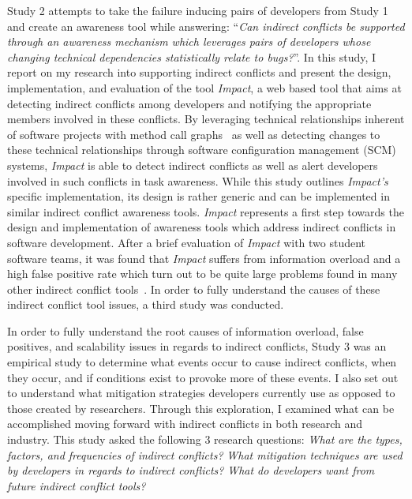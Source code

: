 Study 2 attempts to take the failure inducing pairs of developers from Study 1 and create an awareness tool while
answering: ``\textit{Can indirect conflicts be supported through an awareness mechanism which leverages pairs of
developers whose changing technical dependencies statistically relate to bugs?}''.
In this study, I report on my research into supporting indirect conflicts and present the design, implementation, and 
evaluation of the tool \textit{Impact}, a web based tool that aims at detecting indirect conflicts among developers and 
notifying the appropriate members involved in these conflicts. By leveraging technical relationships inherent of software 
projects with method call graphs~\cite{Lakhotia:1993:CCM} as well as detecting changes to these technical relationships 
through software configuration management (SCM) systems, \textit{Impact} is able to detect indirect conflicts as well as 
alert developers involved in such conflicts in task awareness. While this study outlines \textit{Impact's} specific 
implementation, its design is rather generic and can be implemented in similar indirect conflict awareness tools. 
\textit{Impact} represents a first step towards the design and implementation of awareness tools which address indirect 
conflicts in software development. After a brief evaluation of \textit{Impact} with two student software teams, it was
found that \textit{Impact} suffers from information overload and a high false positive rate which turn out to be quite
large problems found in many other indirect conflict
tools~\cite{Sarma:2007:TSA, Holmes:2010:CAR, Trainer:2005:BGT, Servant:2010:CPI, Borici:2012:CHA}. In order to fully understand 
the causes of these indirect conflict tool issues, a third study was conducted.


In order to fully understand the root causes of information overload, false positives, and
scalability issues in regards to indirect conflicts, Study 3 was an empirical study to determine what events occur to
cause indirect conflicts, when they occur, and if conditions exist to provoke more of these events. 
I also set out to understand what mitigation strategies developers currently use as opposed to those created
by researchers. Through this exploration, I examined what can be accomplished moving forward with indirect conflicts
in both research and industry. This study asked the following 3 research questions: 
\textit{What are the types, factors, and frequencies of indirect conflicts?}
\textit{What mitigation techniques are used by developers in regards to indirect conflicts?}
\textit{What do developers want from future indirect conflict tools?}


